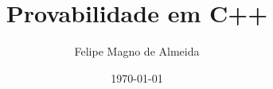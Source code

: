 \documentclass[14pt]{beamer}
\title{Provabilidade em C++}
\author{Felipe Magno de Almeida}
\date{\today}
\begin{document}
\frame
{
  \titlepage
}

\frame
{
  \tableofcontents
}
\end{document}
